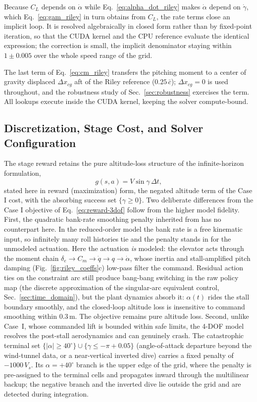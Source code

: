 \documentclass[journal ]{new-aiaa}
\begin{document}
Because $C_L$ depends on $\dot{\alpha}$ while
Eq.~\eqref{eq:alpha_dot_riley} makes $\dot{\alpha}$ depend on
$\dot{\gamma}$, which Eq.~\eqref{eq:gam_riley} in turn obtains from
$C_L$, the rate terms close an implicit loop. It is resolved
algebraically in closed form rather than by fixed-point iteration,
so that the CUDA kernel and the CPU reference evaluate the identical
expression; the correction is small, the implicit denominator
staying within $1 \pm 0.005$ over the whole speed range of the grid.

The last term of Eq.~\eqref{eq:cm_riley} transfers the pitching
moment to a center of gravity displaced $\Delta x_{cg}$ aft of the
Riley reference ($0.25\,\bar{c}$); $\Delta x_{cg} = 0$ is used
throughout, and the robustness study of Sec.~\ref{sec:robustness}
exercises the term. All lookups execute inside the CUDA kernel,
keeping the solver compute-bound.

\subsection{Discretization, Stage Cost, and Solver Configuration}
\label{sec:4dof_solver}

The stage reward retains the
pure altitude-loss structure of the infinite-horizon formulation,
\begin{equation}
    g(s, a) = V \sin\gamma \,\Delta t,
    \label{eq:reward_4dof}
\end{equation}
stated here in reward (maximization) form, the negated altitude term
of the Case I cost, with the absorbing success set
$\{\gamma \geq 0\}$. Two deliberate differences from the
Case I objective of Eq.~\eqref{eq:reward-3dof} follow from the
higher model fidelity. First, the quadratic bank-rate smoothing
penalty inherited from \cite{Bunge2018} has no counterpart here. In
the reduced-order model the bank rate is a free kinematic input, so
infinitely many roll histories tie and the penalty stands in for
the unmodeled actuation. Here the actuation \emph{is} modeled: the
elevator acts through the moment chain
$\delta_e \to C_m \to \dot{q} \to q \to \dot{\alpha}$, whose inertia
and stall-amplified pitch damping (Fig.~\ref{fig:riley_coeffs}c)
low-pass filter the command. Residual action ties on the constraint
arc still produce bang-bang switching in the raw policy map (the
discrete approximation of the singular-arc equivalent control,
Sec.~\ref{sec:time_domain}), but the plant dynamics absorb
it: $\alpha(t)$ rides the stall boundary smoothly, and
the closed-loop altitude loss is insensitive to command smoothing
within $0.3$\,m. The objective remains pure altitude loss. Second,
unlike Case~I, whose commanded lift is bounded within safe limits,
the 4-DOF model resolves the post-stall aerodynamics and can
genuinely crash. The catastrophic terminal set
$\{|\alpha| \geq 40^\circ\} \cup \{\gamma \leq -\pi + 0.05\}$
(angle-of-attack departure beyond the wind-tunnel data, or a
near-vertical inverted dive) carries a fixed penalty of
$-1000\,V_s$. Its $\alpha = +40^\circ$ branch is the upper edge of
the grid, where the penalty is pre-assigned to the terminal cells
and propagates inward through the multilinear backup; the negative
branch and the inverted dive lie outside the grid and are detected
during integration.
\end{document}

